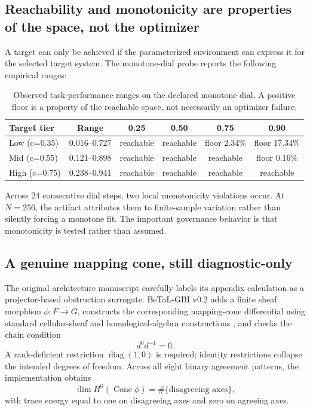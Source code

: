\documentclass[11pt]{article}
\begin{document}
\subsection{Reachability and monotonicity are properties of the space, not the optimizer}

A target can only be achieved if the parameterized environment can express it for the selected target system. The monotone-dial probe reports the following empirical ranges:

\begin{table}[H]
\centering
\small
\caption{Observed task-performance ranges on the declared monotone dial. A positive floor is a property of the reachable space, not necessarily an optimizer failure.}
\begin{tabular}{lccccc}
\toprule
Target tier & Range & 0.25 & 0.50 & 0.75 & 0.90\\
\midrule
Low (c=0.35) & 0.016--0.727 & reachable & reachable & floor 2.34\% & floor 17.34\%\\
Mid (c=0.55) & 0.121--0.898 & reachable & reachable & reachable & floor 0.16\%\\
High (c=0.75) & 0.238--0.941 & reachable & reachable & reachable & reachable\\
\bottomrule
\end{tabular}
\end{table}

Across 24 consecutive dial steps, two local monotonicity violations occur. At \(N=256\), the artifact attributes them to finite-sample variation rather than silently forcing a monotone fit. The important governance behavior is that monotonicity is tested rather than assumed.

\subsection{A genuine mapping cone, still diagnostic-only}

The original architecture manuscript carefully labels its appendix calculation as a projector-based obstruction surrogate. BeTaL-GBI v0.2 adds a finite sheaf morphism \(\phi:F\to G\), constructs the corresponding mapping-cone differential using standard cellular-sheaf and homological-algebra constructions \cite{hansen2019sheaves,weibel1994homological}, and checks the chain condition
\[
d^0d^{-1}=0.
\]
A rank-deficient restriction \(\operatorname{diag}(1,0)\) is required; identity restrictions collapse the intended degrees of freedom. Across all eight binary agreement patterns, the implementation obtains
\[
\dim H^0(\operatorname{Cone}\phi)=\#\{\text{disagreeing axes}\},
\]
with trace energy equal to one on disagreeing axes and zero on agreeing axes.
\end{document}
